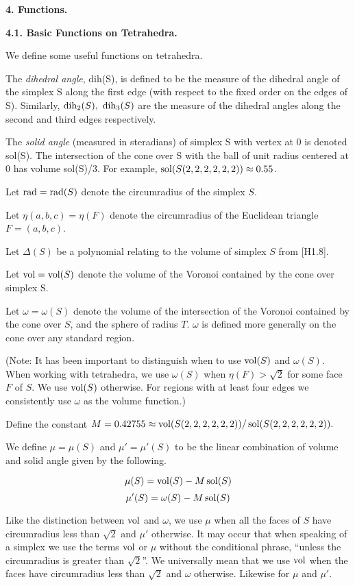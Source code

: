 \bigskip

\centerline{{\bf 4. Functions.}}

\bigskip

{\bf 4.1. Basic Functions on Tetrahedra.}

\bigskip

We define some useful functions on tetrahedra.

The {\it dihedral angle}, dih(S),  is defined to be the measure of the dihedral angle of the simplex S along the first edge (with respect to the fixed order on the edges of S).  Similarly, $\operatorname{dih}_2(S),\ \operatorname{dih}_3(S)$ are the measure of the dihedral angles along the second and third edges respectively.

The {\it solid angle} (measured in steradians) of simplex S with vertex at $0$ is denoted sol(S).  
The intersection of the cone over S with the ball of unit radius centered at $0$ has volume sol(S)/3.  For example, $\operatorname{sol}(S(2,2,2,2,2,2))\approx 0.55$.  

Let $\operatorname{rad}=\operatorname{rad}(S)$ denote the circumradius of the simplex $S$.  

Let $\eta(a,b,c)=\eta(F)$ denote the circumradius of the Euclidean triangle $F=(a,b,c)$.

Let $\Delta(S)$ be a polynomial relating to the volume of simplex $S$ from [H1.8].

Let $\operatorname{vol}=\operatorname{vol}(S)$ denote the volume of the Voronoi contained by the cone over simplex S.

Let $\omega=\omega(S)$ denote the volume of the intersection of the 
Voronoi contained by the cone over $S$, and the sphere of radius $T$.  $\omega$ is defined more generally on the cone over any standard region.

(Note: It has been important to distinguish when to use $\operatorname{vol}(S)$ and $\omega(S)$.  
When working with tetrahedra, we use $\omega(S)$ when $\eta(F) > \sqrt 2$ for some 
face $F$ of $S$.  We use $\operatorname{vol}(S)$ otherwise.  For regions with at least four edges
we consistently use $\omega$ as the volume function.)  

Define the constant $M=0.42755 \approx \operatorname{vol}(S(2,2,2,2,2,2))/\operatorname{sol}(S(2,2,2,2,2,2)).$  

We define $\mu=\mu(S)$ and $\mu'=\mu'(S)$ to be the linear combination of volume 
and solid angle given by the following.

$$\mu(S)=\operatorname{vol}(S)-M \operatorname{sol}(S)$$
$$\mu'(S)=\omega(S)-M \operatorname{sol}(S)$$

Like the distinction between $\operatorname{vol}$ and $\omega$, we use $\mu$ when all the faces 
of $S$ have circumradius less than $\sqrt 2$ and $\mu'$ otherwise.  
It may occur that when speaking of a simplex we use the terms $\operatorname{vol}$ or $\mu$ without 
the conditional phrase, ``unless the circumradius is greater than $\sqrt 2$''.
We universally mean that we use $\operatorname{vol}$ when the faces have circumradius less than 
$\sqrt 2$ and $\omega$ otherwise.  Likewise for $\mu$ and $\mu'$.


